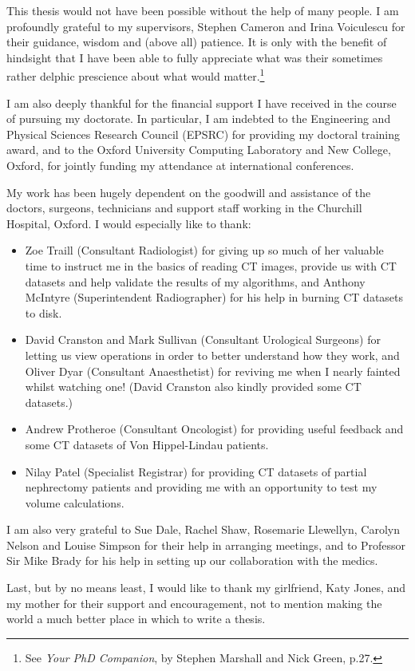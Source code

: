 \begin{acknowledgements}
This thesis would not have been possible without the help of many people. I am profoundly grateful to my supervisors, Stephen Cameron and Irina Voiculescu for their guidance, wisdom and (above all) patience. It is only with the benefit of hindsight that I have been able to fully appreciate what was their sometimes rather delphic prescience about what would matter.\footnote{See \emph{Your PhD Companion}, by Stephen Marshall and Nick Green, p.27.}

I am also deeply thankful for the financial support I have received in the course of pursuing my doctorate. In particular, I am indebted to the Engineering and Physical Sciences Research Council (EPSRC) for providing my doctoral training award, and to the Oxford University Computing Laboratory and New College, Oxford, for jointly funding my attendance at international conferences.

My work has been hugely dependent on the goodwill and assistance of the doctors, surgeons, technicians and support staff working in the Churchill Hospital, Oxford. I would especially like to thank:
%
\begin{itemize}

\item Zoe Traill (Consultant Radiologist) for giving up so much of her valuable time to instruct me in the basics of reading CT images, provide us with CT datasets and help validate the results of my algorithms, and Anthony McIntyre (Superintendent Radiographer) for his help in burning CT datasets to disk.

\item David Cranston and Mark Sullivan (Consultant Urological Surgeons) for letting us view operations in order to better understand how they work, and Oliver Dyar (Consultant Anaesthetist) for reviving me when I nearly fainted whilst watching one! (David Cranston also kindly provided some CT datasets.)

\item Andrew Protheroe (Consultant Oncologist) for providing useful feedback and some CT datasets of Von Hippel-Lindau patients.

\item Nilay Patel (Specialist Registrar) for providing CT datasets of partial nephrectomy patients and providing me with an opportunity to test my volume calculations.

\end{itemize}
%
I am also very grateful to Sue Dale, Rachel Shaw, Rosemarie Llewellyn, Carolyn Nelson and Louise Simpson for their help in arranging meetings, and to Professor Sir Mike Brady for his help in setting up our collaboration with the medics.

Last, but by no means least, I would like to thank my girlfriend, Katy Jones, and my mother for their support and encouragement, not to mention making the world a much better place in which to write a thesis.

\end{acknowledgements}
